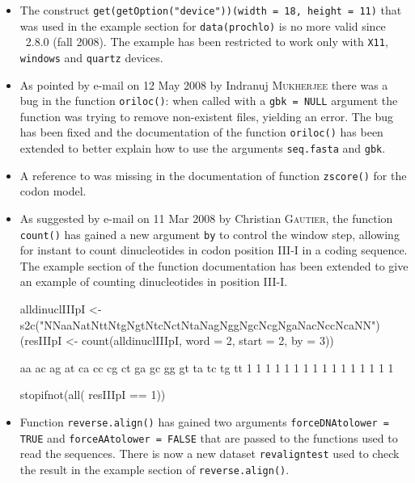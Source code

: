 \documentclass{article}
\begin{document}
\begin{itemize}

\item The construct \texttt{get(getOption("device"))(width = 18, height = 11)}
  that was used in the example section for \texttt{data(prochlo)} is no
  more valid since \Rlogo{}~2.8.0 (fall 2008). The example has been
  restricted to work only with \texttt{X11}, \texttt{windows} and
  \texttt{quartz} devices.

\item As pointed by e-mail on 12 May 2008 by Indranuj \textsc{Mukherjee} there
  was a bug in the function \texttt{oriloc()}: when called with a
  \texttt{gbk = NULL} argument the function was trying to remove
  non-existent files, yielding an error. The bug has been fixed and
  the documentation of the function \texttt{oriloc()} has been
  extended to better explain how to use the arguments \texttt{seq.fasta}
  and \texttt{gbk}.

\item A reference to \cite{GautierC1985} was missing in the documentation
  of function \texttt{zscore()} for the codon model.

\item As suggested by e-mail on 11 Mar 2008 by Christian \textsc{Gautier},
  the function \texttt{count()}
  has gained a new argument \texttt{by} to control the window step,
  allowing for instant to count dinucleotides in codon position III-I
  in a coding sequence. The example section of the function documentation
  has been extended to give an example of counting dinucleotides in
  position III-I.

\begin{Schunk}
\begin{Sinput}
 alldinuclIIIpI <- s2c("NNaaNatNttNtgNgtNtcNctNtaNagNggNgcNcgNgaNacNccNcaNN")
 (resIIIpI <- count(alldinuclIIIpI, word = 2, start = 2, by = 3))
\end{Sinput}
\begin{Soutput}
aa ac ag at ca cc cg ct ga gc gg gt ta tc tg tt 
 1  1  1  1  1  1  1  1  1  1  1  1  1  1  1  1 
\end{Soutput}
\begin{Sinput}
 stopifnot(all( resIIIpI == 1))
\end{Sinput}
\end{Schunk}

\item Function \texttt{reverse.align()} has gained two arguments
  \texttt{forceDNAtolower = TRUE} and \texttt{forceAAtolower = FALSE} 
  that are passed to the functions used to read the sequences.
  There is now a new dataset \texttt{revaligntest} used to check
  the result in the example section of \texttt{reverse.align()}.


\end{itemize}
\end{document}
